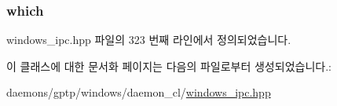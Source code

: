 \subsubsection[{\texorpdfstring{which}{which}}]{ which\hspace{0.3cm}{\ttfamily [private]}}\hypertarget{class_win_n_pipe_ctrl_message_a05a30a0c0a7ecee05dd02c8d03e6f1d5}{}\label{class_win_n_pipe_ctrl_message_a05a30a0c0a7ecee05dd02c8d03e6f1d5}


windows\+\_\+ipc.\+hpp 파일의 323 번째 라인에서 정의되었습니다.



이 클래스에 대한 문서화 페이지는 다음의 파일로부터 생성되었습니다.\+:\begin{DoxyCompactItemize}
\item 
daemons/gptp/windows/daemon\+\_\+cl/\hyperlink{windows__ipc_8hpp}{windows\+\_\+ipc.\+hpp}\end{DoxyCompactItemize}
